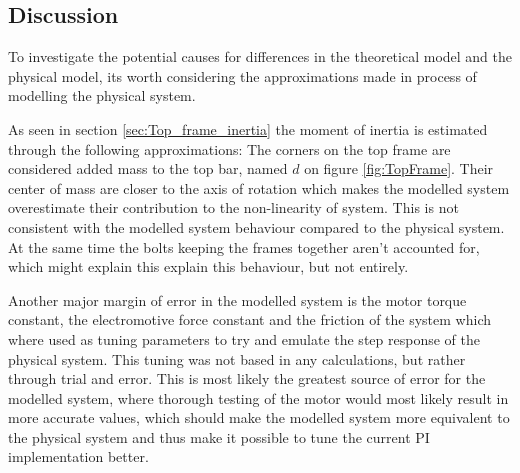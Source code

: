 \documentclass[../../main]{subfiles}
\begin{document}
\subsection{Discussion}
\label{sec:discussion}


To investigate the potential causes for differences in the theoretical model and the physical model, its worth considering the approximations made in process of modelling the physical system.

As seen in section \ref{sec:Top_frame_inertia} the moment of inertia is estimated through the following approximations: The corners on the top frame are considered added mass to the top bar, named $d$ on figure \ref{fig:TopFrame}. Their center of mass are closer to the axis of rotation which makes the modelled system overestimate their contribution to the non-linearity of system. This is not consistent with the modelled system behaviour compared to the physical system.
At the same time the bolts keeping the frames together aren't accounted for, which might explain this explain this behaviour, but not entirely.


Another major margin of error in the modelled system is the motor torque constant, the electromotive force constant and the friction of the system which where used as tuning parameters to try and emulate the step response of the physical system. This tuning was not based in any calculations, but rather through trial and error. This is most likely the greatest source of error for the modelled system, where thorough testing of the motor would most likely result in more accurate values, which should make the modelled system more equivalent to the physical system and thus make it possible to tune the current PI implementation better.
\end{document}

